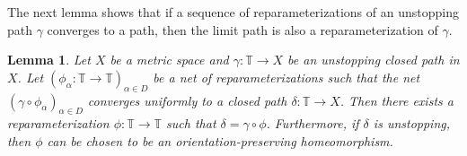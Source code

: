 \documentclass[reqno,centertags,12pt]{amsart}
\newtheorem{lemma}[theorem]{Lemma}
\theoremstyle{definition}
\numberwithin{equation}{section}
\newcommand{\seq}[1]{\left( #1 \right)}
\newcommand{\bbT}{{\mathbb{T}}}
\begin{document}
The next lemma shows that if a sequence of reparameterizations
of an unstopping path $\gamma$ converges to a path,
then the limit path is also a reparameterization of $\gamma$.

\begin{lemma}\label{LA.6}
	Let $X$ be a metric space and $\gamma\colon\bbT\to X$ be an unstopping
	closed path in $X$. Let $\seq{\phi_{\alpha}\colon\bbT\to\bbT}_{\alpha\in D}$ be a net of
	reparameterizations such that the net $\seq{\gamma\circ\phi_{\alpha}}_{\alpha\in D}$
    converges uniformly to a closed path $\delta\colon\bbT\to X$. Then there exists a
	reparameterization $\phi\colon\bbT\to\bbT$ such that $\delta = \gamma\circ\phi$.
	Furthermore, if $\delta$ is unstopping, then $\phi$ can be chosen to be
	an orientation-preserving homeomorphism.
\end{lemma}
\end{document}

